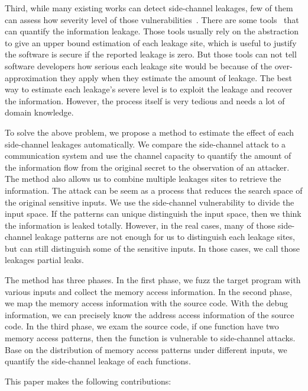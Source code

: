 Third, while many existing works can detect side-channel leakages, few of them can assess how severity level of those vulnerabilities~\cite{wang2017cached,doychev2015cacheaudit,brotzman2019casym,wang2019identifying,weiser2018data,wichelmann2018microwalk}. There are some tools~\cite{doychev2015cacheaudit,chattopadhyay2019quantifying} that can quantify the information leakage.  Those tools usually rely on the abstraction to give an upper bound estimation of each leakage site, which is useful to justify the software is secure if the reported leakage is zero. But those tools can not tell software developers how serious each leakage site would be because of the over-approximation they apply when they estimate the amount of leakage. The best way to estimate each leakage's severe level is to exploit the leakage and recover the information. However, the process itself is very tedious and needs a lot of domain knowledge. 

To solve the above problem, we propose a method to estimate the effect of each side-channel leakages automatically. We compare the side-channel attack to a communication system and use the channel capacity to quantify the amount of the information flow from the original secret to the observation of an attacker. The method also allows us to combine multiple leakages sites to retrieve the information. The  attack can be seem as a process that reduces the search space of the original sensitive inputs. We use the side-channel vulnerability to divide the input space. If the patterns can unique distinguish the input space, then we think the information is leaked totally. However, in the real cases, many of those side-channel leakage patterns are not enough for us to distinguish each leakage sites, but can still distinguish some of the sensitive inputs. In those cases, we call those leakages partial leaks. 

The method has three phases. In the first phase, we fuzz the target program with various inputs and collect the memory access information. In the second phase, we map the memory access information with the source code. With the debug information, we can precisely know the address access information of the source code. In the third phase, we exam the source code, if one function have two memory access patterns, then the function is vulnerable to side-channel attacks. Base on the distribution of memory access patterns under different inputs, we quantify the side-channel leakage of each functions.

This paper makes the following contributions:

